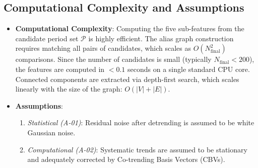 \subsection{Computational Complexity and Assumptions} \label{sec:method_complexity}
\begin{itemize}
\item \textbf{Computational Complexity}: Computing the five sub-features from the candidate period set $\mathcal{P}$ is highly efficient. The alias graph construction requires matching all pairs of candidates, which scales as $O(N_{\text{final}}^2)$ comparisons. Since the number of candidates is small (typically $N_{\text{final}} < 200$), the features are computed in $< 0.1$ seconds on a single standard CPU core. Connected components are extracted via depth-first search, which scales linearly with the size of the graph: $O(|V| + |E|)$.
\item \textbf{Assumptions}:
    \begin{enumerate}
    \item \textit{Statistical (A-01)}: Residual noise after detrending is assumed to be white Gaussian noise.
    \item \textit{Computational (A-02)}: Systematic trends are assumed to be stationary and adequately corrected by Co-trending Basis Vectors (CBVs).
    \end{enumerate}
\end{itemize}

